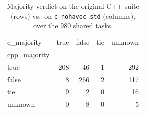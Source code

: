 \begin{table}[t]
  \centering
  \caption{Majority verdict on the original C++ suite (rows) vs.\ on \texttt{c-nohavoc_std} (columns), over the 980 shared tasks.}
  \label{tab:dual-majority-c-nohavoc_std}
\begin{tabular}{lrrrr}
\toprule
c_majority & true & false & tie & unknown \\
cpp_majority &  &  &  &  \\
\midrule
true & 208 & 46 & 1 & 292 \\
false & 8 & 266 & 2 & 117 \\
tie & 9 & 2 & 0 & 16 \\
unknown & 0 & 8 & 0 & 5 \\
\bottomrule
\end{tabular}
\end{table}
